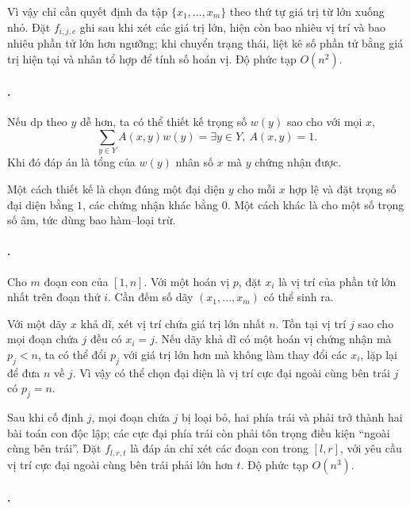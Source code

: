\documentclass[11pt]{article}
\begin{document}
Vì vậy chỉ cần quyết định đa tập \(\{x_1,\ldots,x_m\}\) theo thứ tự giá trị từ
lớn xuống nhỏ. Đặt \(f_{i,j,c}\) ghi sau khi xét các giá trị lớn, hiện còn bao
nhiêu vị trí và bao nhiêu phần tử lớn hơn ngưỡng; khi chuyển trạng thái, liệt
kê số phần tử bằng giá trị hiện tại và nhân tổ hợp để tính số hoán vị. Độ phức
tạp \(O(n^2)\).

\paragraph{.}

Nếu \(\mathrm{dp}\) theo \(y\) dễ hơn, ta có thể thiết kế trọng số \(w(y)\) sao
cho với mọi \(x\),
\[
  \sum_{y\in Y} A(x,y)w(y)=\exists y\in Y,\ A(x,y)=1.
\]
Khi đó đáp án là tổng của \(w(y)\) nhân số \(x\) mà \(y\) chứng nhận được.

Một cách thiết kế là chọn đúng một đại diện \(y\) cho mỗi \(x\) hợp lệ và đặt
trọng số đại diện bằng \(1\), các chứng nhận khác bằng \(0\). Một cách khác là
cho một số trọng số âm, tức dùng bao hàm--loại trừ.

\paragraph{.}
Cho \(m\) đoạn con của \([1,n]\). Với một hoán vị \(p\), đặt \(x_i\) là vị trí
của phần tử lớn nhất trên đoạn thứ \(i\). Cần đếm số dãy
\((x_1,\ldots,x_m)\) có thể sinh ra.

Với một dãy \(x\) khả dĩ, xét vị trí chứa giá trị lớn nhất \(n\). Tồn tại vị
trí \(j\) sao cho mọi đoạn chứa \(j\) đều có \(x_i=j\). Nếu dãy khả dĩ có một
hoán vị chứng nhận mà \(p_j<n\), ta có thể đổi \(p_j\) với giá trị lớn hơn mà
không làm thay đổi các \(x_i\), lặp lại để đưa \(n\) về \(j\). Vì vậy có thể
chọn đại diện là vị trí cực đại ngoài cùng bên trái \(j\) có \(p_j=n\).

Sau khi cố định \(j\), mọi đoạn chứa \(j\) bị loại bỏ, hai phía trái và phải
trở thành hai bài toán con độc lập; các cực đại phía trái còn phải tôn trọng
điều kiện ``ngoài cùng bên trái''. Đặt \(f_{l,r,t}\) là đáp án chỉ xét các đoạn
con trong \([l,r]\), với yêu cầu vị trí cực đại ngoài cùng bên trái phải lớn
hơn \(t\). Độ phức tạp \(O(n^3)\).

\paragraph{.}
\end{document}
